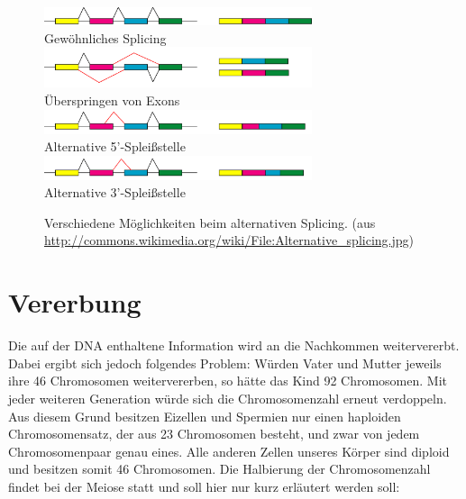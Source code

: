 \begin{figure}[htbp]
\begin{center}
\includegraphics[width=0.7\textwidth]{bilder/Splicing_1} \\
Gewöhnliches Splicing \\
\includegraphics[width=0.7\textwidth]{bilder/Splicing_4} \\
Überspringen von Exons \\
\includegraphics[width=0.7\textwidth]{bilder/Splicing_5} \\
Alternative 5'-Spleißstelle \\
\includegraphics[width=0.7\textwidth]{bilder/Splicing_6} \\
Alternative 3'-Spleißstelle
\end{center}
\caption[Alternatives Splicing (aus \protect\url{http://commons.wikimedia.org/wiki/File:Alternative_splicing.jpg})]{Verschiedene Möglichkeiten beim alternativen Splicing. (aus \protect\url{http://commons.wikimedia.org/wiki/File:Alternative_splicing.jpg})}
\label{fig:bio:pbysn:splicing}
\end{figure}

\section{Vererbung}
\label{sec:bio:erb}

Die auf der DNA enthaltene Information wird an die Nachkommen weitervererbt. Dabei ergibt sich jedoch folgendes Problem: Würden Vater und Mutter jeweils ihre 46 Chromosomen weitervererben, so hätte das Kind 92 Chromosomen. Mit jeder weiteren Generation würde sich die Chromosomenzahl erneut verdoppeln. Aus diesem Grund besitzen Eizellen und Spermien nur einen haploiden Chromosomensatz, der aus 23 Chromosomen besteht, und zwar von jedem Chromosomenpaar genau eines. Alle anderen Zellen unseres Körper sind diploid und besitzen somit 46 Chromosomen. Die Halbierung der Chromosomenzahl findet bei der Meiose statt und soll hier nur kurz erläutert werden soll:
\newpage

